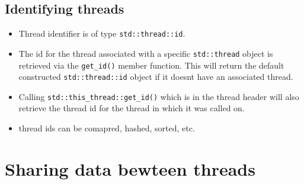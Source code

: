 \documentclass[11pt, a4paper]{article}
\theoremstyle{definition}
\theoremstyle{remark}
\newcommand{\code}[1]{\lstinline|#1|}
\begin{document}
\subsection{Identifying threads}
\begin{itemize}
    \item Thread identifier is of type \code{std::thread::id}.
    \item The id for the thread associated with a specific \code{std::thread} object is retrieved via the \code{get_id()} member function. This will return the default constructed \code{std::thread::id} object if it doesnt have an associated thread.
    \item Calling \code{std::this_thread::get_id()} which is in the thread header will also retrieve the thread id for the thread in which it was called on.
    \item thread ids can be comapred, hashed, sorted, etc.
\end{itemize}
\section{Sharing data bewteen threads}
\end{document}
